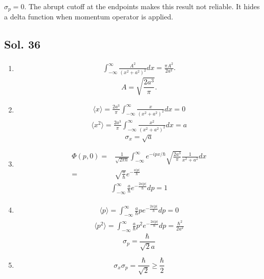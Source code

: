 $\sigma_p=0.$ The abrupt cutoff at the endpoints makes this result not reliable. It hides a delta function when momentum operator is applied.

\subsection*{Sol. 36}
\begin{enumerate}
    \item 
    \begin{align*}
        \int_{-\infty}^{\infty}
        \frac{A^2}{(x^2+a^2)^2}dx = \frac{\pi A^2}{2a^3}.
    \end{align*}
    $$
    A = \sqrt{\frac{2a^3}{\pi}}.
    $$
    \item 
    \begin{align*}
        \langle x\rangle
        =
        \frac{2a^3}{\pi}\int_{-\infty}^{\infty} \frac{x}{(x^2+a^2)^2}dx=0
    \end{align*}
    \begin{align*}
        \langle x^2\rangle
        =
        \frac{2a^3}{\pi}\int_{-\infty}^{\infty} \frac{x^2}{(x^2+a^2)^2}dx=a
    \end{align*}
    $$
    \sigma_x=\sqrt{a}
    $$
    \item 
    \begin{align*}
        \Phi(p,0)
        =&
        \frac{1}{\sqrt{2\pi\hbar}}
        \int_{-\infty}^{\infty}
        e^{-ipx/\hbar}
        \sqrt{\frac{2a^3}{\pi}}
        \frac{1}{x^2+a^2}dx\\
        =&\sqrt{\frac{a}{\hbar}}e^{-\frac{a|p|}{\hbar}}
    \end{align*}
    \begin{align*}
        \int_{-\infty}^{\infty}
        \frac{a}{\hbar}e^{-\frac{2a|p|}{\hbar}}dp = 1
    \end{align*}
    \item 
    \begin{align*}
        \langle p\rangle
        =\int_{-\infty}^{\infty}
        \frac{a}{\hbar}pe^{-\frac{2a|p|}{\hbar}}dp= 0
    \end{align*}
    \begin{align*}
        \langle p^2\rangle
        =\int_{-\infty}^{\infty}
        \frac{a}{\hbar}p^2e^{-\frac{2a|p|}{\hbar}}dp= \frac{\hbar^2}{2a^2}
    \end{align*}
    $$
    \sigma_p = \frac{\hbar}{\sqrt{2}a}
    $$
    \item 
    $$
    \sigma_x\sigma_p=\frac{\hbar}{\sqrt{2}}\geq \frac{\hbar}{2}
    $$
\end{enumerate}

